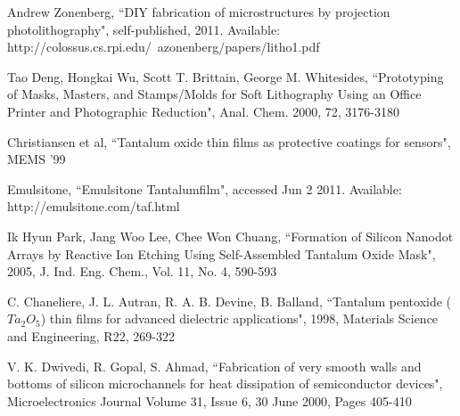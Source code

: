 \documentclass[twocolumn]{article}
\begin{document}
\begin{thebibliography}{99}
	Andrew Zonenberg, ``DIY fabrication of microstructures by projection photolithography",
	self-published, 2011. Available: http://colossus.cs.rpi.edu/~azonenberg/papers/litho1.pdf

	Tao Deng, Hongkai Wu, Scott T. Brittain, George M. Whitesides, ``Prototyping of Masks, Masters,
	and Stamps/Molds for Soft Lithography Using an Office Printer and Photographic Reduction",
	Anal. Chem. 2000, 72, 3176-3180
	
	Christiansen et al, ``Tantalum oxide thin films as protective coatings for sensors", MEMS '99

	Emulsitone, ``Emulsitone Tantalumfilm", accessed Jun 2 2011. Available:
	http://emulsitone.com/taf.html
	
	Ik Hyun Park, Jang Woo Lee, Chee Won Chuang, ``Formation of Silicon Nanodot Arrays by Reactive
	Ion Etching Using Self-Assembled Tantalum Oxide Mask", 2005, J. Ind. Eng. Chem., Vol. 11, No. 4,
	590-593
	
	C. Chaneliere, J. L. Autran, R. A. B. Devine, B. Balland, ``Tantalum pentoxide ($Ta_2O_5$) thin
	films for advanced dielectric applications", 1998, Materials Science and Engineering, R22,
	269-322
	
	V. K. Dwivedi, R. Gopal, S. Ahmad, ``Fabrication of very smooth walls and bottoms of silicon
	microchannels for heat dissipation of semiconductor devices", Microelectronics Journal
	Volume 31, Issue 6, 30 June 2000, Pages 405-410 

\end{thebibliography}
\end{document}
